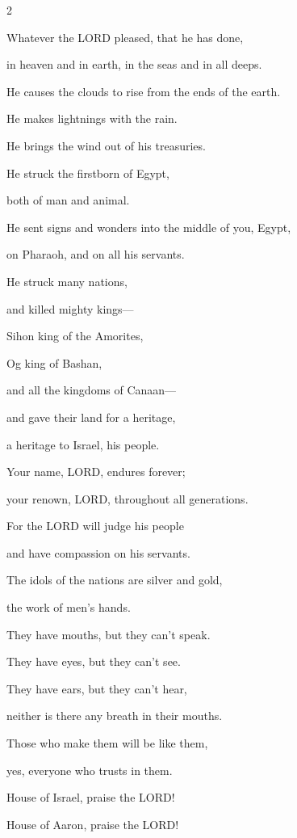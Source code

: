 \begin{multicols}{2}
	
	\myverse{}Whatever the LORD pleased, that he has done,
	
	in heaven and in earth, in the seas and in all deeps.
	
	
	\myverse{}He causes the clouds to rise from the ends of the earth.
	
	He makes lightnings with the rain.
	
	He brings the wind out of his treasuries.
	
	
	\myverse{}He struck the firstborn of Egypt,
	
	both of man and animal.
	
	
	\myverse{}He sent signs and wonders into the middle of you, Egypt,
	
	on Pharaoh, and on all his servants.
	
	
	\myverse{}He struck many nations,
	
	and killed mighty kings---
	
	
	\myverse{}Sihon king of the Amorites,
	
	Og king of Bashan,
	
	and all the kingdoms of Canaan---
	
	
	\myverse{}and gave their land for a heritage,
	
	a heritage to Israel, his people.
	
	
	\myverse{}Your name, LORD, endures forever;
	
	your renown, LORD, throughout all generations.
	
	
	\myverse{}For the LORD will judge his people
	
	and have compassion on his servants.
	
	\vspace{\baselineskip}
	
	\myverse{}The idols of the nations are silver and gold,
	
	the work of men’s hands.
	
	
	\myverse{}They have mouths, but they can’t speak.
	
	They have eyes, but they can’t see.
	
	
	\myverse{}They have ears, but they can’t hear,
	
	neither is there any breath in their mouths.
	
	
	\myverse{}Those who make them will be like them,
	
	yes, everyone who trusts in them.
	
	
	\myverse{}House of Israel, praise the LORD!
	
	House of Aaron, praise the LORD!
	

\end{multicols}
